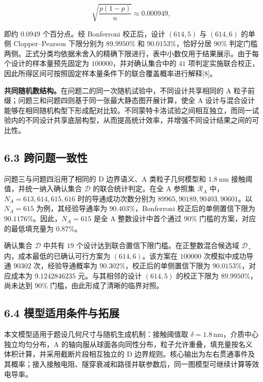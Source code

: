 \[
\sqrt{\frac{p(1-p)}{n}}\approx 0.000949,
\]

即约 \(0.0949\) 个百分点。经 Bonferroni 校正后，设计 \((614,5)\) 与 \((614,6)\) 的单侧 Clopper--Pearson 下限分别为 \(89.9950\%\) 和 \(90.0153\%\)，恰好分居 \(90\%\) 判定门槛两侧。正式分类均依据未舍入的精确下限进行，表中小数仅用于结果展示。由于每个设计的样本量预先固定为 \(100000\)，并对确认集合中的 \(41\) 项判定实施联合校正，因此所得区间可按照固定样本量条件下的联合覆盖概率进行解释{[}8{]}。

\textbf{共同随机数结构。}在问题二的同一次随机试验中，不同设计共享相同的 A 粒子前缀；问题三和问题四则基于同一张最大静态图开展计算，使全 A 设计与混合设计能够在相同随机构型下形成配对比较。不同蒙特卡洛试验之间相互独立，而同一试验内的不同设计共享底层构型，从而提高统计效率，并增强不同设计结果之间的可比性。

\subsection{6.3 跨问题一致性}\label{ux8de8ux95eeux9898ux4e00ux81f4ux6027ux4e0eux8bc1ux636eux5c42ux7ea7}

问题三与问题四沿用了相同的 D 边界语义、A 类粒子几何模型和 \(1.8\ \mathrm{nm}\) 接触阈值，并统一纳入确认集合 \(\mathcal D\) 的联合统计判定。在全 A 参照集 \(\mathcal R_A\) 中，\(N_A=613,614,615,616\) 时的导通成功次数分别为 \(89965,90189,90403,90601\)。以 \(N_A=615\) 为例，其经验导通率为 \(90.403\%\)，Bonferroni 校正后的单侧置信下限为 \(90.1176\%\)。因此，\(N_A=615\) 是全 A 整数设计中首个通过 \(90\%\) 门槛的方案，对应的最低填充量为 \(0.87\%\)。

确认集合 \(\mathcal D\) 中共有 \(19\) 个设计达到联合置信下限门槛。在正整数混合候选域 \(\mathcal D_+\) 内，成本最低的已确认可行方案为 \((614,6)\)。该方案在 \(100000\) 次模拟中成功导通 \(90302\) 次，经验导通概率为 \(90.302\%\)，校正后的单侧置信下限为 \(90.0153\%\)，对应成本为 \(9.1242846235\) 元。与其相邻的设计 \((614,5)\) 的校正下限为 \(89.9950\%\)，尚未达到 \(90\%\) 门槛，由此形成了清晰的临界对照。

\subsection{6.4 模型适用条件与拓展}\label{ux9002ux7528ux8303ux56f4ux4e0eux7ed3ux679cux8fb9ux754c}

本文模型适用于题设几何尺寸与随机生成机制：接触阈值取 \(\delta=1.8\,\mathrm{nm}\)，介质中心独立均匀分布，A 的轴向服从球面各向同性分布，粒子允许重叠，填充量按名义体积计算，并采用截断片段相互独立的 D 边界规则。核心输出为左右贯通事件及其概率；接入接触电阻、隧穿衰减和路径并联参数后，同一图模型可继续计算等效电导率。

